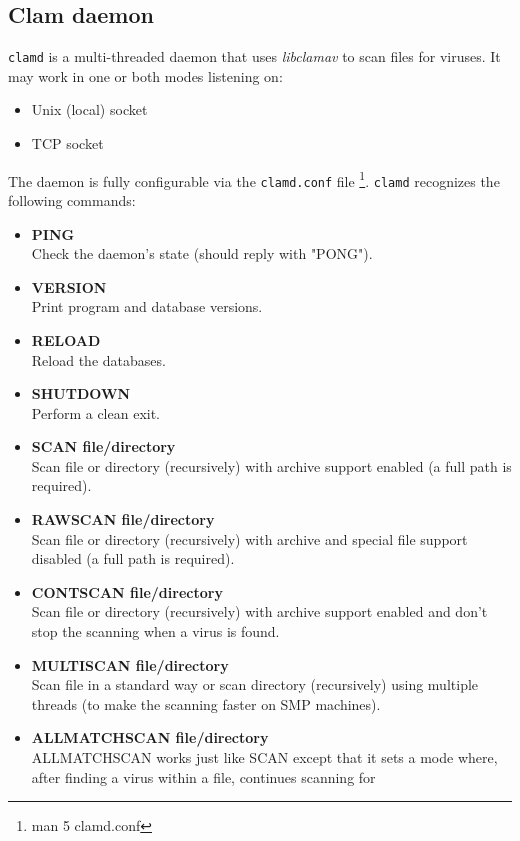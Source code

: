 \documentclass[a4paper,titlepage,12pt]{article}
\begin{document}
    \subsection{Clam daemon}\label{clamd}
    \verb+clamd+ is a multi-threaded daemon that uses \emph{libclamav}
    to scan files for viruses. It may work in one or both modes listening on:
    \begin{itemize}
	\item Unix (local) socket
	\item TCP socket
    \end{itemize}
    The daemon is fully configurable via the \verb+clamd.conf+ file
    \footnote{man 5 clamd.conf}. \verb+clamd+ recognizes the following commands:
    \begin{itemize}
	\item \textbf{PING}\\
	    Check the daemon's state (should reply with "PONG").
	\item \textbf{VERSION}\\
	    Print program and database versions.
	\item \textbf{RELOAD}\\
	    Reload the databases.
	\item \textbf{SHUTDOWN}\\
	    Perform a clean exit.
	\item \textbf{SCAN file/directory}\\
	    Scan file or directory (recursively) with archive support
	    enabled (a full path is required).
	\item \textbf{RAWSCAN file/directory}\\
	    Scan file or directory (recursively) with archive and special file
	    support disabled (a full path is required).
	\item \textbf{CONTSCAN file/directory}\\
	    Scan file or directory (recursively) with archive support
	    enabled and don't stop the scanning when a virus is found.
	\item \textbf{MULTISCAN file/directory}\\
	    Scan file in a standard way or scan directory (recursively) using
	    multiple threads (to make the scanning faster on SMP machines).
	\item \textbf{ALLMATCHSCAN file/directory}\\
	    ALLMATCHSCAN works just like SCAN except that it sets a mode
	    where, after finding a virus within a file, continues scanning for

\end{itemize}
\end{document}
